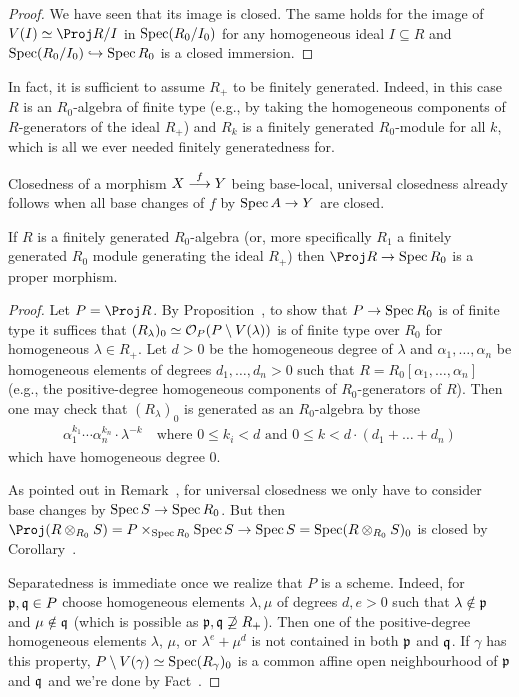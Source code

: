 \documentclass[a4paper,parskip=half,numbers=enddot, DIV=12]{scrreprt}
\begin{document}
\begin{proof}
    We have seen that its image is closed. The same holds for the image of $V(I) \simeq \Proj R/I$ in $\operatorname{Spec} (R_0/I_0)$ for any homogeneous ideal $I\subseteq R$ and $\Spec (R_0/I_0)\monomorphism \Spec R_0$ is a closed immersion.
\end{proof}
\begin{rem}
    In fact, it is sufficient to assume $R_+$ to be finitely generated. Indeed, in this case $R$ is an $R_0$-algebra of finite type (e.g., by taking the homogeneous components of $R$-generators of the ideal $R_+$) and $R_k$ is a finitely generated $R_0$-module for all $k$, which is all we ever needed finitely generatedness for.
\end{rem}
\begin{rem}
    Closedness of a morphism $X\morphism[f] Y$ being base-local, universal closedness already follows when all base changes of $f$ by $\Spec A \morphism Y$ are closed.
\end{rem}
\begin{cor}
    If $R$ is a finitely generated $R_0$-algebra (or, more specifically $R_1$ a finitely generated $R_0$ module generating the ideal $R_+$) then $\Proj R\morphism \Spec R_0$ is a proper morphism.
\end{cor}
\begin{proof}
	Let $P=\Proj R$. By Proposition~, to show that $P\morphism\Spec R_0$ is of finite type it suffices that $(R_\lambda)_0\simeq \mathcal{O}_P(P\setminus V(\lambda))$ is of finite type over $R_0$ for homogeneous $\lambda\in R_+$. Let $d>0$ be the homogeneous degree of $\lambda$ and  $\alpha_1,\ldots,\alpha_n$ be homogeneous elements of degrees $d_1,\ldots,d_n>0$ such that $R=R_0[\alpha_1,\ldots,\alpha_n]$ (e.g., the positive-degree homogeneous components of $R_0$-generators of $R$). Then one may check that $(R_\lambda)_0$ is generated as an $R_0$-algebra by those
	\begin{align*}
		\alpha_1^{k_1}\cdots \alpha_n^{k_n}\cdot\lambda^{-k}\quad\text{where }0\leq k_i<d\text{ and }0\leq k<d\cdot(d_1+\ldots+d_n)
	\end{align*}
	which have homogeneous degree $0$.
	
	As pointed out in Remark~, for universal closedness we only have to consider base changes by $\Spec S\morphism\Spec R_0$. But then $\Proj(R\otimes_{R_0}S)=P\times_{\Spec R_0}\Spec S\morphism\Spec S=\Spec (R\otimes_{R_0}S)_0$ is closed by Corollary~.
	
	Separatedness is immediate once we realize that $P$ is a scheme. Indeed, for $\mathfrak{p},\mathfrak{q}\in P$ choose homogeneous elements $\lambda,\mu$ of degrees $d,e>0$ such that $\lambda\notin\mathfrak{p}$ and $\mu\notin\mathfrak{q}$ (which is possible as $\mathfrak{p},\mathfrak{q}\not\supseteq R_+$). Then one of the positive-degree homogeneous elements $\lambda$, $\mu$, or $\lambda^e+\mu^d$ is not contained in both $\mathfrak{p}$ and $\mathfrak{q}$. If $\gamma$ has this property, $P\setminus V(\gamma)\simeq \operatorname{Spec} (R_\gamma)_0$ is a common affine open neighbourhood of $\mathfrak{p}$ and $\mathfrak{q}$ and we're done by Fact~.
\end{proof}
\end{document}
